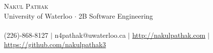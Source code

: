 \documentclass[10pt]{article}
\begin{document}
\small
\smallskip
\vspace*{-45pt}

\begin{center}
  {\Huge \scshape {Nakul Pathak}} \\
  \vspace*{6pt} 
{\fontsize{10}{1}\selectfont University of Waterloo $\cdot$ 2B Software Engineering} \\
\vspace{-4pt}
\hspace*{-18pt} \hrulefill \\
\vspace{2pt}
\hspace*{-18pt} (226)-868-8127 $|$ n4pathak@uwaterloo.ca $|$ \url{http://nakulpathak.com} $|$  \url{https://github.com/nakulpathak3}
\vspace{-5pt}
\end{center}


\vspace{8pt}
\end{document}
